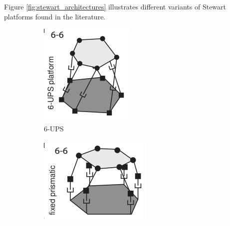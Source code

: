 Figure \ref{fig:stewart_architectures} illustrates different variants of
Stewart platforms found in the literature.
\begin{figure}
	\centering
	\begin{subfigure}{0.3\textwidth}
		\centering
		\includegraphics[width=\textwidth]{../figures/stewart_architectures_c}
		\caption{6-UPS}
		\label{fig:stewart_architectures_a}
	\end{subfigure}
	\begin{subfigure}{0.3\textwidth}
		\centering
		\includegraphics[width=\textwidth]{../figures/stewart_architectures_d}

\end{subfigure}
\end{figure}
